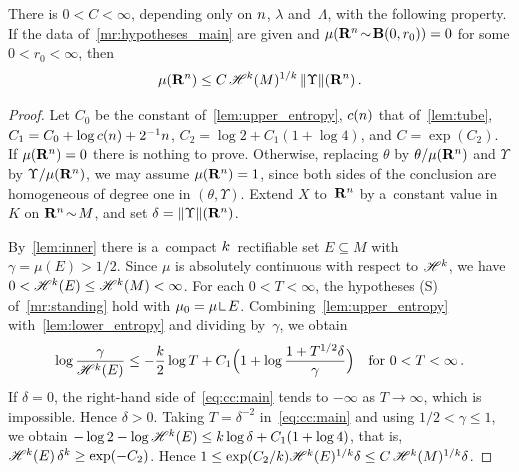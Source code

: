 \documentclass[a4paper,twoside,leqno]{article}
\begin{document}
\begin{lemma}
    \label{lem:compact_case}
    There is $0 < C < \infty$, depending only on $n$, $\lambda$ and~$\Lambda$, with the
    following property. If the data of~\ref{mr:hypotheses_main} are given and $\mu(\mathbf{R}^{n}
    \!\sim\! \mathbf{B}(0,r_0)) = 0$ for some $0 < r_0 < \infty$, then
    \begin{displaymath}
        \mu(\mathbf{R}^{n}) \le C \, \mathscr{H}^{k}(M)^{1/k} \, \|\Upsilon\|(\mathbf{R}^{n}) \,.
    \end{displaymath}
\end{lemma}

\begin{proof}
    Let $C_0$ be the constant of~\ref{lem:upper_entropy}, $c(n)$ that of~\ref{lem:tube}, $C_1 =
    C_0 + \log c(n) + 2^{-1} n$, $C_2 = \log 2 + C_1 (1 + \log 4)$, and $C = \exp(C_2)$. If
    $\mu(\mathbf{R}^{n}) = 0$ there is nothing to prove. Otherwise, replacing $\theta$ by $\theta /
    \mu(\mathbf{R}^{n})$ and $\Upsilon$ by $\Upsilon / \mu(\mathbf{R}^{n})$, we may assume
    $\mu(\mathbf{R}^{n}) = 1$, since both sides of the conclusion are homogeneous of degree one in
    $(\theta,\Upsilon)$. Extend $X$ to~$\mathbf{R}^{n}$ by a~constant value in~$K$ on $\mathbf{R}^{n}
    \!\sim\! M$, and set $\delta = \|\Upsilon\|(\mathbf{R}^{n})$.

    By~\ref{lem:inner} there is a~compact $k$~rectifiable set $E \subseteq M$ with $\gamma =
    \mu(E) > 1/2$. Since $\mu$ is absolutely continuous with respect to $\mathscr{H}^{k}$, we have $0
    < \mathscr{H}^{k}(E) \le \mathscr{H}^{k}(M) < \infty$. For each $0 < T < \infty$, the hypotheses (S)
    of~\ref{mr:standing} hold with $\mu_0 = \mu \restrict E$. Combining~\ref{lem:upper_entropy}
    with~\ref{lem:lower_entropy} and dividing by~$\gamma$, we obtain
    \begin{equation}
        \label{eq:cc:main}
        \log \frac{\gamma}{\mathscr{H}^{k}(E)} \le - \frac{k}{2} \log T + C_1 \Bigl( 1 + \log
        \frac{1 + T^{1/2} \delta}{\gamma} \Bigr)
        \quad \text{for $0 < T < \infty$} \,.
    \end{equation}
    If $\delta = 0$, the right-hand side of~\eqref{eq:cc:main} tends to $-\infty$ as $T \to \infty$,
    which is impossible. Hence $\delta > 0$. Taking $T = \delta^{-2}$ in~\eqref{eq:cc:main} and
    using $1/2 < \gamma \le 1$, we obtain $- \log 2 - \log \mathscr{H}^{k}(E) \le k \log \delta +
    C_1 (1 + \log 4)$, that is, $\mathscr{H}^{k}(E) \, \delta^{k} \ge \exp(-C_2)$. Hence $1 \le
    \exp(C_2/k) \mathscr{H}^{k}(E)^{1/k} \delta \le C \, \mathscr{H}^{k}(M)^{1/k} \delta$.
\end{proof}
\end{document}
